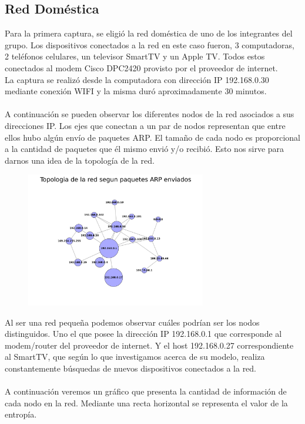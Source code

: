 \subsection{Red Doméstica}

Para la primera captura, se eligió la red doméstica de uno de los integrantes del grupo. Los dispositivos conectados a la red en este caso fueron, 3 computadoras, 2 teléfonos celulares, un televisor SmartTV y un Apple TV. Todos estos conectados al modem Cisco DPC2420 provisto por el proveedor de internet.
\\
La captura se realizó desde la computadora con dirección IP 192.168.0.30 mediante conexión WIFI y la misma duró aproximadamente 30 minutos.
\\\\
A continuación se pueden observar los diferentes nodos de la red asociados a sus direcciones IP. Los ejes que conectan a un par de nodos representan que entre ellos hubo algún envío de paquetes ARP. El tamaño de cada nodo es proporcional a la cantidad de paquetes que él mismo envió y/o recibió. Esto nos sirve para darnos una idea de la topología de la red.

\begin{figure}[ht!]
  \centering
   \includegraphics[width=0.7\textwidth]{graficos/domestica_network.png}
  \caption{}
  \label{fig:domestica_network}
\end{figure}

Al ser una red pequeña podemos observar cuáles podrían ser los nodos distinguidos. Uno el que posee la dirección IP 192.168.0.1 que corresponde al modem/router del proveedor de internet. Y el host 192.168.0.27 correspondiente al SmartTV, que según lo que investigamos acerca de su modelo, realiza constantemente búsquedas de nuevos dispositivos conectados a la red.
\\\\
A continuación veremos un gráfico que presenta la cantidad de información de cada nodo en la red. Mediante una recta horizontal se representa el valor de la entropía.

